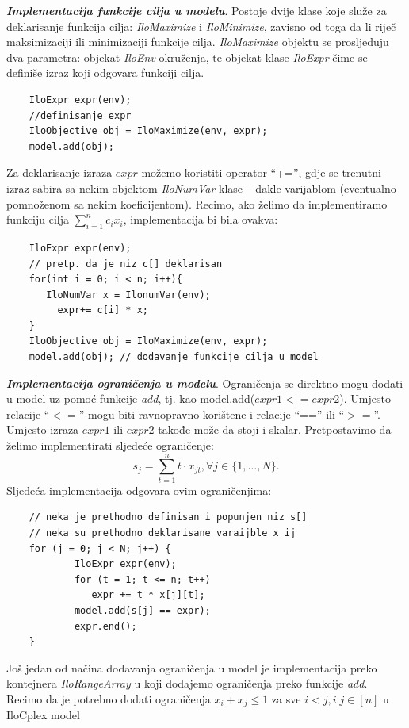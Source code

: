 \documentclass[a4paper, utf8, 11pt, colorlinks]{book}
\theoremstyle{definition}
\begin{document}
 \noindent \textbf{\emph{Implementacija funkcije cilja u modelu}}. 
 Postoje dvije klase koje služe za deklarisanje funkcija cilja: \emph{IloMaximize} i \emph{IloMinimize}, zavisno od toga da li riječ maksimizaciji ili minimizaciji funkcije cilja.  \emph{IloMaximize} objektu se prosljeđuju dva parametra: objekat \emph{IloEnv} okruženja, te objekat klase \emph{IloExpr} čime se definiše  izraz koji odgovara funkciji cilja. 
 
 \begin{verbatim}
 	IloExpr expr(env);
 	//definisanje expr
 	IloObjective obj = IloMaximize(env, expr);
 	model.add(obj);
 \end{verbatim}
 
 \noindent Za deklarisanje izraza $expr$ možemo koristiti operator  ``+='', gdje se trenutni izraz sabira sa nekim objektom \emph{IloNumVar} klase -- dakle varijablom (eventualno pomnoženom sa nekim koeficijentom). 
 Recimo, ako želimo da implementiramo funkciju cilja $\sum_{i=1}^n c_i x_i$, implementacija bi bila ovakva:
 
 \begin{verbatim}
 	IloExpr expr(env);
 	// pretp. da je niz c[] deklarisan
 	for(int i = 0; i < n; i++){
       IloNumVar x = IlonumVar(env);
 	     expr+= c[i] * x;
 	}
 	IloObjective obj = IloMaximize(env, expr);
 	model.add(obj); // dodavanje funkcije cilja u model
 \end{verbatim}
 
 \noindent \textbf{\emph{Implementacija ograničenja u modelu}}. Ograničenja se direktno mogu dodati  u model uz pomoć funkcije \emph{add}, tj. kao 
 model.add($expr1 <= expr2$). Umjesto relacije ``$<=$'' mogu biti ravnopravno korištene i relacije ``=='' ili ``$>=$''. Umjesto izraza $expr1$ ili $expr2$ takođe može da stoji i skalar. Pretpostavimo da želimo implementirati sljedeće ograničenje:
 $$s_j = \sum_{t=1}^n t \cdot x_{jt}, \forall j \in \{1,\ldots,N\}.$$ 
 Sljedeća implementacija odgovara ovim ograničenjima: 
 \begin{verbatim}
 	// neka je prethodno definisan i popunjen niz s[]
 	// neka su prethodno deklarisane varaijble x_ij
 	for (j = 0; j < N; j++) {
 		    IloExpr expr(env);
 		    for (t = 1; t <= n; t++)
 	  	       expr += t * x[j][t];            
 		    model.add(s[j] == expr);
 		    expr.end();
 	}
 \end{verbatim}
 Još jedan od načina dodavanja ograničenja u model je implementacija preko kontejnera \emph{IloRangeArray} u koji dodajemo ograničenja preko funkcije \emph{add}.   
 Recimo da je potrebno dodati ograničenja $x_i + x_j \leq 1$ za sve $i<j, i.j \in [n]$ u IloCplex model
 
\end{document}
